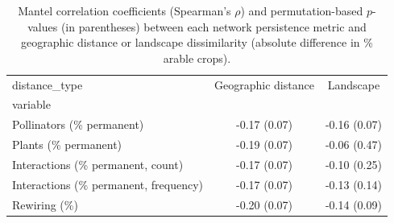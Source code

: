 \begin{table}
\caption{Mantel correlation coefficients (Spearman's $\rho$) and permutation-based $p$-values (in parentheses) between each network persistence metric and geographic distance or landscape dissimilarity (absolute difference in \% arable crops).}
\label{tab:mantel_results}
\begin{tabular}{lcc}
\toprule
distance_type & Geographic distance & Landscape \\
variable &  &  \\
\midrule
Pollinators (\% permanent) & -0.17 (0.07) & -0.16 (0.07) \\
Plants (\% permanent) & -0.19 (0.07) & -0.06 (0.47) \\
Interactions (\% permanent, count) & -0.17 (0.07) & -0.10 (0.25) \\
Interactions (\% permanent, frequency) & -0.17 (0.07) & -0.13 (0.14) \\
Rewiring (\%) & -0.20 (0.07) & -0.14 (0.09) \\
\bottomrule
\end{tabular}
\end{table}
